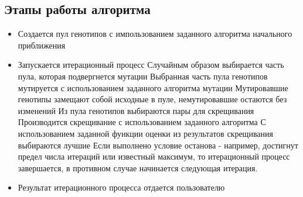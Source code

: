 \subsection{Этапы работы алгоритма}%
\begin{itemize}%
\item Создается пул генотипов с импользованием заданного алгоритма начального приближения
\item Запускается итерационный процесс
	\subitem Случайным образом выбирается часть пула, которая подвергнется мутации
	\subitem Выбранная часть пула генотипов мутируется с использованием заданного алгоритма мутации
	\subitem Мутировавшие генотипы замещают собой исходные в пуле, немутировавшие остаются без изменений
	\subitem Из пула генотипов выбираются пары для скрещивания
	\subitem Производится скрещивание с использованием заданного алгоритма
	\subitem С использованием заданной функции оценки из результатов скрещивания выбираются лучшие 
	\subitem Если выполнено условие останова - например, достигнут предел числа итераций или известный максимум, то итерационный процесс завершается, в противном случае  начинается следующая итерация.
\item Результат итерационного процесса отдается пользователю
\end{itemize}

